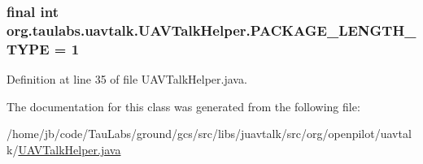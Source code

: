 \hypertarget{classorg_1_1taulabs_1_1uavtalk_1_1_u_a_v_talk_helper_a2f030393c6a563452702a5d1c0cc06fd}{
\subsubsection[{\-P\-A\-C\-K\-A\-G\-E\-\_\-\-L\-E\-N\-G\-T\-H\-\_\-\-T\-Y\-P\-E}]{\setlength{\rightskip}{0pt plus 5cm}final int {\bf org.\-taulabs.\-uavtalk.\-U\-A\-V\-Talk\-Helper.\-P\-A\-C\-K\-A\-G\-E\-\_\-\-L\-E\-N\-G\-T\-H\-\_\-\-T\-Y\-P\-E} = 1}}\label{classorg_1_1taulabs_1_1uavtalk_1_1_u_a_v_talk_helper_a2f030393c6a563452702a5d1c0cc06fd}


\-Definition at line 35 of file \-U\-A\-V\-Talk\-Helper.\-java.



\-The documentation for this class was generated from the following file\-:\begin{DoxyCompactItemize}
\item 
/home/jb/code/\-Tau\-Labs/ground/gcs/src/libs/juavtalk/src/org/openpilot/uavtalk/\hyperlink{_u_a_v_talk_helper_8java}{\-U\-A\-V\-Talk\-Helper.\-java}\end{DoxyCompactItemize}
